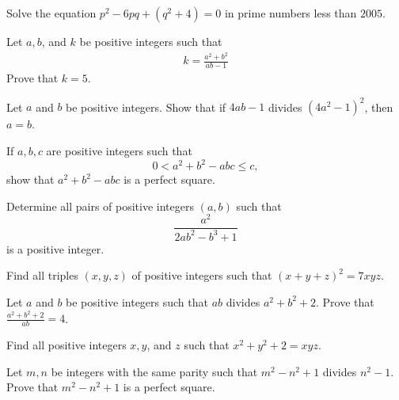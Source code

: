 \documentclass{subfile}
\begin{document}
	\begin{problem}[IZHO 2005] %
		Solve the equation  $ p^2 - 6pq + (q^2 + 4) = 0$ in prime numbers less than $2005$.
	\end{problem}

	\begin{problem}
		Let $ a,b$, and $k $ be positive integers such that
			\begin{align*}
				k=\frac{a^2+b^2}{ab-1}
			\end{align*}
		Prove that $ k=5 $.
	\end{problem}

	\begin{problem}[IMO 2007] %
		Let $a$ and $b$ be positive integers. Show that if $4ab - 1$ divides $(4a^{2} - 1)^{2}$, then $a = b$.
	\end{problem}

	\begin{problem}[PEN] %
		If $a, b, c$ are positive integers such that \[0 < a^{2}+b^{2}-abc \le c,\] show that $a^{2}+b^{2}-abc$ is a perfect square.
	\end{problem}

	\begin{problem} %
		Determine all pairs of positive integers $(a,b)$ such that \[ \dfrac{a^2}{2ab^2-b^3+1} \] is a positive integer.
	\end{problem}

	\begin{problem} %
		Find all triples $(x,y,z)$ of positive integers such that $(x+y+z)^2=7xyz$.
	\end{problem}

	\begin{problem} %
		 Let $a$ and $b$ be positive integers such that $ab$ divides $a^2 + b^2 + 2$. Prove that $\frac{a^2 + b^2 + 2}{ab} = 4$.
	\end{problem}

	\begin{problem} %
		Find all positive integers $x,y$, and $z$ such that $x^2+y^2+2=xyz$.
	\end{problem}

	\begin{problem}[Ireland 2005] %
		Let $m,n$ be integers with the same parity such that $m^2-n^2+1$ divides $n^2-1$. Prove that $m^2-n^2+1$ is a perfect square.
	\end{problem}
\end{document}
